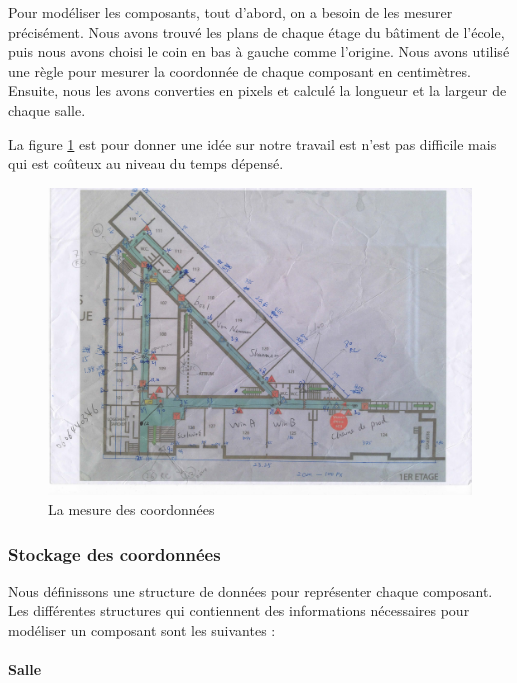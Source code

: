 \documentclass[twoside]{EPURapport}
\begin{document}
Pour modéliser les composants, tout d'abord, on a besoin de les mesurer précisément. Nous avons trouvé les plans de chaque étage du bâtiment de l'école, puis nous avons choisi le coin en bas à gauche comme l'origine. Nous avons utilisé une règle pour mesurer la coordonnée de chaque composant en centimètres. Ensuite, nous les avons converties en pixels et calculé la longueur et la largeur de chaque salle.

La figure \ref{fig:mesure} est pour donner une idée sur notre travail est n'est pas difficile mais qui est coûteux au niveau du temps dépensé.

	\begin{figure}[!htbp]
	\centering
		\includegraphics[scale=0.45]{img/mesure.jpg}
	\caption{La mesure des coordonnées}
	\label{fig:mesure}
	\end{figure}

\subsubsection{Stockage des coordonnées}
Nous définissons une structure de données pour représenter chaque composant. Les différentes structures qui contiennent des informations nécessaires pour modéliser un composant sont les suivantes :

\paragraph{Salle}
\end{document}
